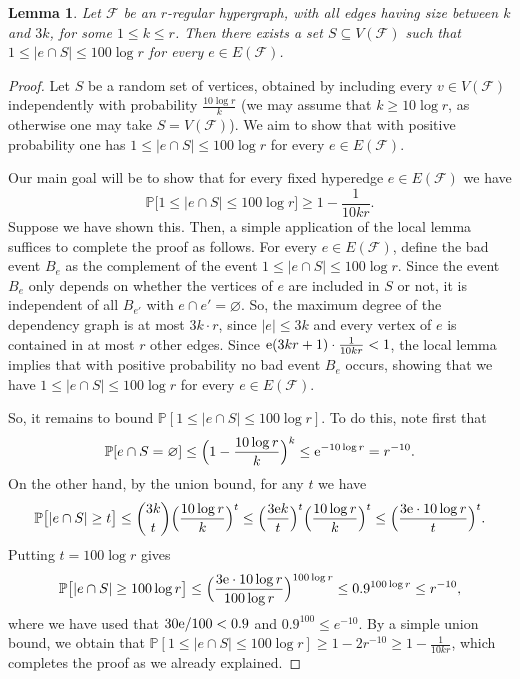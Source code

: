 \documentclass[11pt, a4paper]{article}
\numberwithin{theorem}{section} %
\newtheorem{lemma}[theorem]{Lemma}
\theoremstyle{remark}
\theoremstyle{definition}
\def\cF{\mathcal{F}}
\def\Pb{\mathbb{P}}
\begin{document}
\begin{lemma}\label{lemma:low_uniformity}
Let $\cF$ be an $r$-regular hypergraph, with all edges having size between $k$ and $3k$, for some $1\leq k\leq r$. Then there exists a set $S\subseteq V(\cF)$ such that $1\leq |e\cap S|\leq 100\log r$ for every $e\in E(\cF)$.
\end{lemma}
\begin{proof}
Let $S$ be a random set of vertices, obtained by including every $v\in V(\cF)$ independently with probability $\frac{10\log r}{k}$ (we may assume that $k\geq 10\log r$, as otherwise one may take $S=V(\cF)$). We aim to show that with positive probability one has $1\leq |e\cap S|\leq 100\log r$ for every $e\in E(\cF)$.

Our main goal will be to show that for every fixed hyperedge $e\in E(\cF)$ we have \[\Pb\big[1\leq |e\cap S|\leq 100 \log r\big]\geq 1- \frac{1}{10kr}.\] Suppose we have shown this. Then, a simple application of the local lemma suffices to complete the proof as follows. For every $e\in E(\cF)$, define the bad event $B_e$ as the complement of the event $1\leq |e\cap S|\leq 100\log r$. Since the event $B_e$ only depends on whether the vertices of $e$ are included in $S$ or not, it is independent of all $B_{e'}$ with $e\cap e'=\varnothing$. So, the maximum degree of the dependency graph is at most $3k\cdot r$, since $|e|\leq 3k$ and every vertex of $e$ is contained in at most $r$ other edges. Since ${\rm{e}}(3kr+1)\cdot \frac{1}{10kr}<1$, the local lemma implies that with positive probability no bad event $B_e$ occurs, showing that we have $1\leq |e\cap S|\leq 100\log r$ for every $e\in E(\cF)$.

So, it remains to bound $\Pb[1\leq |e\cap S|\leq 100\log r]$. To do this, note first that 
\[\Pb[e\cap S=\varnothing]\leq \Big(1-\frac{10\log r}{k}\Big)^k\leq {\rm{e}}^{-10\log r}=r^{-10}.\]
On the other hand, by the union bound, for any $t$ we have
\[\Pb\big[|e\cap S|\geq t\big]\leq \binom{3k}{t}\Big(\frac{10\log r}{k}\Big)^t\leq \Big(\frac{3{\rm{e}}k}{t}\Big)^t \Big(\frac{10\log r}{k}\Big)^t\leq  \Big(\frac{3{\rm{e}} \cdot 10\log r}{t}\Big)^t.\]
Putting $t=100\log r$ gives 
\[\Pb\big[|e\cap S|\geq 100\log r\big]\leq \Big(\frac{3{\rm{e}} \cdot 10\log r}{100\log r}\Big)^{100\log r}\leq 0.9^{100\log r}\leq r^{-10},\]
where we have used that $30{\rm{e}}/100<0.9$ and $0.9^{100}\leq e^{-10}$. By a simple union bound, we obtain that $\Pb[1\leq |e\cap S|\leq 100\log r]\geq 1-2r^{-10}\geq 1-\frac{1}{10kr}$, which completes the proof as we already explained.
\end{proof}
\end{document}
